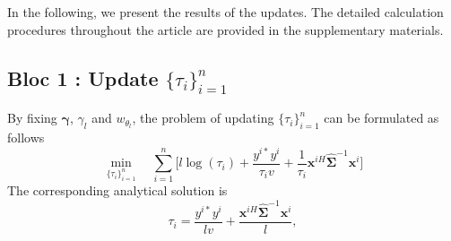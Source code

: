     \vspace{-0.3cm}
    \noindent
    In the following, we present the results of the updates. The detailed calculation procedures throughout the article are provided in the supplementary materials. 
    \vspace{-0.5cm}
    \subsection*{\textbf{Bloc 1 : Update $\{\tau_i\}_{i=1}^n$}}
    \label{subsection:update_tau}
        \noindent
        By fixing $\boldsymbol{\gamma}$, $\gamma_{l}$ and $w_{\theta_{l}}$, the problem of updating $\{\tau_i\}_{i=1}^n$ can be formulated as follows %
        \vspace{-0.1cm}
        \begin{equation}
            \label{Equation:problem1}
            \min_{\{\tau_i\}_{i=1}^n} \quad \sum_{i=1}^n \Bigg[ l \log(\tau_i) + \frac{y^{i*} y^i}{\tau_i v} + \frac{1}{\tau_i} \mathbf{x}^{iH} \hat{\mathbf{\Sigma}}^{-1} \mathbf{x}^i \Bigg]  %
        \end{equation}
        The corresponding analytical solution is
        \vspace{-0.2cm}
        \begin{equation}
            \label{Equation:tau}
            \tau_i = \frac{y^{i*} y^i}{l v} + \frac{\mathbf{x}^{iH} \hat{\mathbf{\Sigma}}^{-1} \mathbf{x}^i}{l},
        \end{equation}
        \vspace{-1cm}
